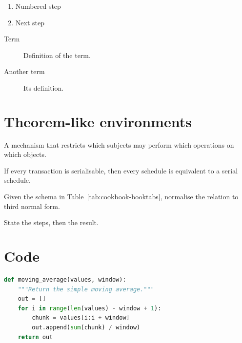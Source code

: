 \documentclass[10pt, a4paper]{article}
\begin{document}
\begin{enumerate}
    \item Numbered step
    \item Next step
\end{enumerate}

\begin{description}
    \item[Term] Definition of the term.
    \item[Another term] Its definition.
\end{description}

\section{Theorem-like environments}

\begin{definition}
    A mechanism that restricts which subjects may perform which operations on
    which objects.
\end{definition}

\begin{theorem}
    If every transaction is serialisable, then every schedule is equivalent to
    a serial schedule.
\end{theorem}

\begin{problem}
    Given the schema in Table~\ref{tab:cookbook-booktabs}, normalise the
    relation to third normal form.
\end{problem}

\begin{solution}
    State the steps, then the result.
\end{solution}

\section{Code}

\begin{lstlisting}[language=Python, caption={A numbered, syntax-highlighted listing.}]
def moving_average(values, window):
    """Return the simple moving average."""
    out = []
    for i in range(len(values) - window + 1):
        chunk = values[i:i + window]
        out.append(sum(chunk) / window)
    return out
\end{lstlisting}
\end{document}
